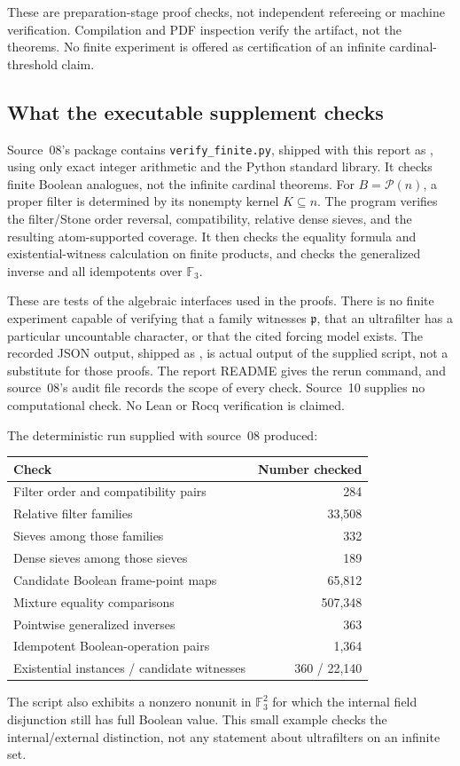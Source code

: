 \documentclass[11pt,letterpaper]{article}
\theoremstyle{definition}
\theoremstyle{remark}
\newcommand{\pow}{\mathcal P}
\newcommand{\cp}{\mathfrak p}
\begin{document}
These are preparation-stage proof checks, not independent refereeing or
machine verification. Compilation and PDF inspection verify the artifact,
not the theorems. No finite experiment is offered as certification of an
infinite cardinal-threshold claim.

\subsection{What the executable supplement checks}
Source~08's package contains \texttt{verify\_finite.py}, shipped with this
report as , using only
exact integer arithmetic and the Python standard library. It checks
finite Boolean analogues, not the infinite cardinal theorems.
For $B=\pow(n)$, a proper filter is determined by its nonempty
kernel $K\subseteq n$. The program verifies the filter/Stone
order reversal, compatibility, relative dense sieves, and the
resulting atom-supported coverage. It then checks the equality
formula and existential-witness calculation on finite products,
and checks the generalized inverse and all idempotents over
$\mathbb F_3$.

These are tests of the algebraic interfaces used in the proofs.
There is no finite experiment capable of verifying that a family
witnesses $\cp$, that an ultrafilter has a particular uncountable
character, or that the cited forcing model exists. The recorded
JSON output, shipped as
, is actual
output of the supplied script, not a substitute for those proofs. The
report README gives the rerun command, and source~08's audit file
 records the scope of every
check. Source~10 supplies no computational check. No Lean or Rocq
verification is claimed.

The deterministic run supplied with source~08 produced:
\begin{center}
\small
\begin{tabular}{lr}
\toprule
Check & Number checked\\
\midrule
Filter order and compatibility pairs & 284\\
Relative filter families & 33,508\\
Sieves among those families & 332\\
Dense sieves among those sieves & 189\\
Candidate Boolean frame-point maps & 65,812\\
Mixture equality comparisons & 507,348\\
Pointwise generalized inverses & 363\\
Idempotent Boolean-operation pairs & 1,364\\
Existential instances / candidate witnesses & 360 / 22,140\\
\bottomrule
\end{tabular}
\end{center}
The script also exhibits a nonzero nonunit in $\mathbb F_3^2$ for
which the internal field disjunction still has full Boolean value.
This small example checks the internal/external distinction, not
any statement about ultrafilters on an infinite set.
\end{document}

